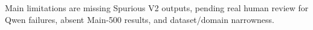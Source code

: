 Main limitations are missing Spurious V2 outputs, pending real human review for Qwen failures, absent Main-500 results, and dataset/domain narrowness.

